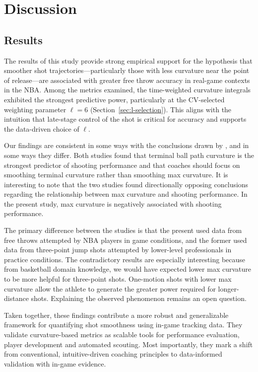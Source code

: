 \documentclass{article}
\begin{document}
\section{Discussion}

    \subsection{Results}
      
      The results of this study provide strong empirical support for the hypothesis that smoother shot trajectories---particularly those with less curvature near the point of release---are associated with greater free throw accuracy in real-game contexts in the NBA. Among the metrics examined, the time-weighted curvature integrals exhibited the strongest predictive power, particularly at the CV-selected weighting parameter $\ell = 6$ (Section~\ref{sec:l-selection}). This aligns with the intuition that late-stage control of the shot is critical for accuracy and supports the data-driven choice of $\ell$.
      
      Our findings are consistent in some ways with the conclusions drawn by \citet{slegers_role_2024}, and in some ways they differ. Both studies found that terminal ball path curvature is the strongest predictor of shooting performance and that coaches should focus on smoothing terminal curvature rather than smoothing max curvature. It is interesting to note that the two studies found directionally opposing conclusions regarding the relationship between max curvature and shooting performance. In the present study, max curvature is negatively associated with shooting performance.

      The primary difference between the studies is that the present used data from free throws attempted by NBA players in game conditions, and the former used data from three-point jump shots attempted by lower-level professionals in practice conditions. The contradictory results are especially interesting because from basketball domain knowledge, we would have expected lower max curvature to be more helpful for three-point shots. One-motion shots with lower max curvature allow the athlete to generate the greater power required for longer-distance shots. Explaining the observed phenomenon remains an open question. 
      
      Taken together, these findings contribute a more robust and generalizable framework for quantifying shot smoothness using in-game tracking data. They validate curvature-based metrics as scalable tools for performance evaluation, player development and automated scouting. Most importantly, they mark a shift from conventional, intuitive-driven coaching principles to data-informed validation with in-game evidence.
\end{document}
